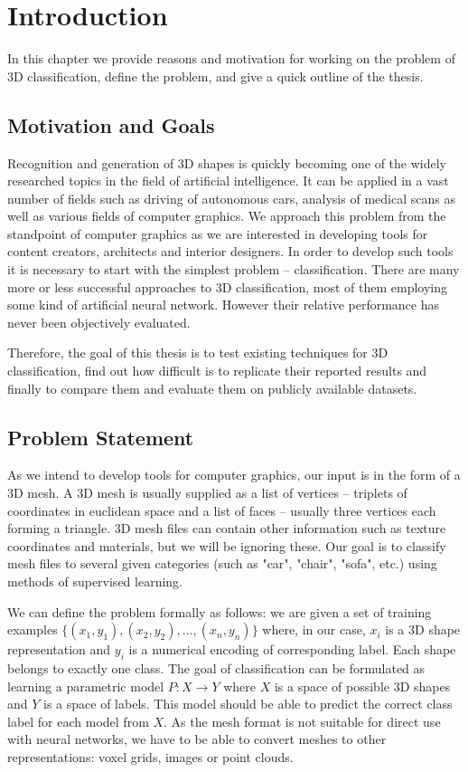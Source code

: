 \chapter{Introduction}
\label{sec:chap1}
In this chapter we provide reasons and motivation for working on the problem of 3D classification, define the problem, and give a quick outline of the thesis.

\section{Motivation and Goals}
Recognition and generation of 3D shapes is quickly becoming one of the widely researched topics in the field of artificial intelligence. It can be applied in a vast number of fields such as driving of autonomous cars, analysis of medical scans as well as various fields of computer graphics. We approach this problem from the standpoint of computer graphics as we are interested in developing tools for content creators, architects and interior designers. In order to develop such tools it is necessary to start with the simplest problem -- classification. 
There are many more or less successful approaches to 3D classification, most of them employing some kind of artificial neural network. However their relative performance has never been objectively evaluated.\par
Therefore, the goal of this thesis is to test existing techniques for 3D classification, find out how difficult is to replicate their reported results and finally to compare them and evaluate them on publicly available datasets.
\section{Problem Statement}
\label{sec:problemstatement}
As we intend to develop tools for computer graphics, our input is in the form of a 3D mesh. A 3D mesh is usually supplied as a list of vertices -- triplets of coordinates in euclidean space and a list of faces -- usually three vertices each forming a triangle. 3D mesh files can contain other information such as texture coordinates and materials, but we will be ignoring these. Our goal is to classify mesh files to several given categories (such as "car", "chair", "sofa", etc.) using methods of supervised learning.\par
We can define the problem formally as follows: we are given a set of training examples $\{(x_1,y_1),(x_2,y_2), ..., (x_n,y_n)\}$ where, in our case, $x_i$ is a 3D shape representation and $y_i$ is a numerical encoding of corresponding label. Each shape belongs to exactly one class. The goal of classification can be formulated as learning a parametric model $P:X \rightarrow Y$ where $X$ is a space of possible 3D shapes and $Y$ is a space of labels. This model should be able to predict the correct class label for each model from $X$.
As the mesh format is not suitable for direct use with neural networks, we have to be able to convert meshes to other representations: voxel grids, images or point clouds.
